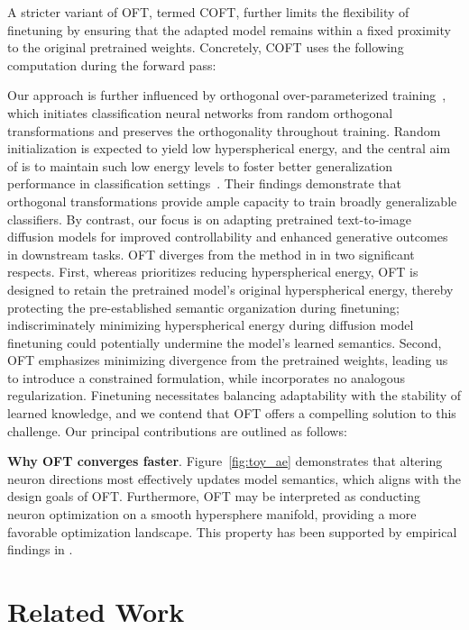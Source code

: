 A stricter variant of OFT, termed COFT, further limits the flexibility of finetuning by ensuring that the adapted model remains within a fixed proximity to the original pretrained weights. Concretely, COFT uses the following computation during the forward pass:

Our approach is further influenced by orthogonal over-parameterized training~\cite{liu2021orthogonal}, which initiates classification neural networks from random orthogonal transformations and preserves the orthogonality throughout training. Random initialization is expected to yield low hyperspherical energy, and the central aim of \cite{liu2021orthogonal} is to maintain such low energy levels to foster better generalization performance in classification settings~\cite{liu2018learning,lin2020regularizing}. Their findings demonstrate that orthogonal transformations provide ample capacity to train broadly generalizable classifiers. By contrast, our focus is on adapting pretrained text-to-image diffusion models for improved controllability and enhanced generative outcomes in downstream tasks. OFT diverges from the method in \cite{liu2021orthogonal} in two significant respects. First, whereas \cite{liu2021orthogonal} prioritizes reducing hyperspherical energy, OFT is designed to retain the pretrained model’s original hyperspherical energy, thereby protecting the pre-established semantic organization during finetuning; indiscriminately minimizing hyperspherical energy during diffusion model finetuning could potentially undermine the model’s learned semantics. Second, OFT emphasizes minimizing divergence from the pretrained weights, leading us to introduce a constrained formulation, while \cite{liu2021orthogonal} incorporates no analogous regularization. Finetuning necessitates balancing adaptability with the stability of learned knowledge, and we contend that OFT offers a compelling solution to this challenge. Our principal contributions are outlined as follows:

\textbf{Why OFT converges faster}. Figure~\ref{fig:toy_ae} demonstrates that altering neuron directions most effectively updates model semantics, which aligns with the design goals of OFT. Furthermore, OFT may be interpreted as conducting neuron optimization on a smooth hypersphere manifold, providing a more favorable optimization landscape. This property has been supported by empirical findings in \cite{liu2021orthogonal}.

\section{Related Work}

